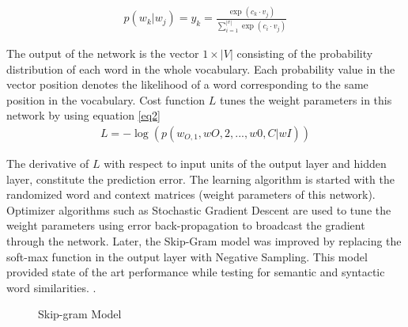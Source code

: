 \documentclass[12pt]{report} %
\begin{document}
\begin{align}
\label{eq1}
p(w_{k} | w_{j}) = y_{k} = \frac{\exp( c_{k} \cdot v_{j})}{\sum_{i=1}^{|v|} \exp(c_{i} \cdot v_{j}) } 
\end{align}


The output of the network is the vector $1\times|V|$ consisting of the probability distribution of each word in the whole vocabulary. Each probability value in the vector position denotes the likelihood of a word corresponding to the same position in the vocabulary. Cost function $L$ tunes the weight parameters in this network by using equation \ref{eq2}
\begin{align}
\label{eq2}
L = - \log ( p(w_{O,1}, wO,2, . . . , w0,C|wI))
\end{align} 


The derivative of $L$ with respect to input units of the output layer and hidden layer, constitute the prediction error. The learning algorithm is started with the randomized word and context matrices (weight parameters of this network). Optimizer algorithms such as Stochastic Gradient Descent are used to tune the weight parameters using error back-propagation to broadcast the gradient through the network. Later, the Skip-Gram model was improved by replacing the soft-max function in the output layer with Negative Sampling. This model provided state of the art performance while testing for semantic and syntactic word similarities. \citep{mikolov2014word2vec}. 


\begin{figure}[!tbp]
	\centering
	\caption{Skip-gram Model \citep{jurafsky2014speech}}
	\label{skipgram}	
\end{figure}
\end{document}
